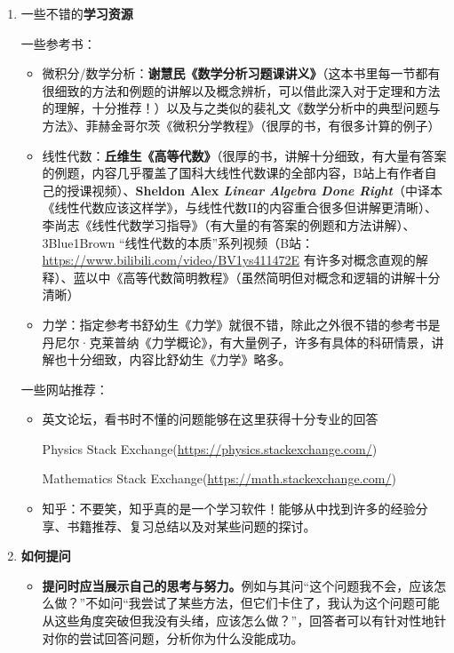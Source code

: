 \documentclass{ctexart}
\begin{document}
\begin{enumerate}[leftmargin=*, labelsep=0.5em]
\item 一些不错的\textbf{学习资源}

一些参考书：

\begin{itemize}
  \item 微积分/数学分析：\textbf{谢慧民《数学分析习题课讲义》}（这本书里每一节都有很细致的方法和例题的讲解以及概念辨析，可以借此深入对于定理和方法的理解，十分推荐！）以及与之类似的裴礼文《数学分析中的典型问题与方法》、菲赫金哥尔茨《微积分学教程》（很厚的书，有很多计算的例子）
  
    \item 线性代数：\textbf{丘维生《高等代数》}（很厚的书，讲解十分细致，有大量有答案的例题，内容几乎覆盖了国科大线性代数课的全部内容，B站上有作者自己的授课视频）、\textbf{Sheldon Alex \textit{Linear Algebra Done Right}}（中译本《线性代数应该这样学》，与线性代数II的内容重合很多但讲解更清晰）、李尚志《线性代数学习指导》（有大量的有答案的例题和方法讲解）、3Blue1Brown “线性代数的本质”系列视频（B站：\url{https://www.bilibili.com/video/BV1ys411472E} 有许多对概念直观的解释）、蓝以中《高等代数简明教程》（虽然简明但对概念和逻辑的讲解十分清晰）
  
  \item 力学：指定参考书舒幼生《力学》就很不错，除此之外很不错的参考书是丹尼尔·克莱普纳《力学概论》，有大量例子，许多有具体的科研情景，讲解也十分细致，内容比舒幼生《力学》略多。
\end{itemize}

一些网站推荐：

\begin{itemize}
  \item 英文论坛，看书时不懂的问题能够在这里获得十分专业的回答
  
  Physics Stack Exchange(\url{https://physics.stackexchange.com/})
  
  Mathematics Stack Exchange(\url{https://math.stackexchange.com/})
  
  \item 知乎：不要笑，知乎真的是一个学习软件！能够从中找到许多的经验分享、书籍推荐、复习总结以及对某些问题的探讨。
\end{itemize}

\item \textbf{如何提问}

\begin{itemize}
\item \textbf{提问时应当展示自己的思考与努力。}例如与其问“这个问题我不会，应该怎么做？”不如问“我尝试了某些方法，但它们卡住了，我认为这个问题可能从这些角度突破但我没有头绪，应该怎么做？”，回答者可以有针对性地针对你的尝试回答问题，分析你为什么没能成功。


\end{itemize}
\end{enumerate}
\end{document}
